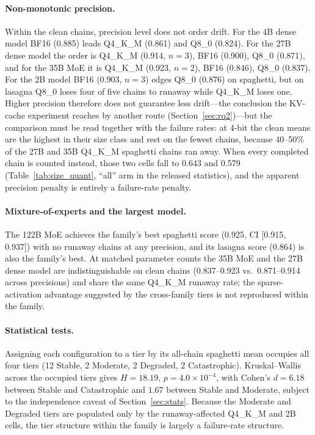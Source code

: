 \documentclass[11pt]{article}
\begin{document}
\paragraph{Non-monotonic precision.}
Within the clean chains, precision level does not order drift. For the 4B
dense model BF16 (0.885) leads Q4\_K\_M (0.861) and Q8\_0 (0.824). For the
27B dense model the order is Q4\_K\_M (0.914, $n=3$), BF16 (0.900), Q8\_0
(0.871), and for the 35B MoE it is Q4\_K\_M (0.923, $n=2$), BF16 (0.846),
Q8\_0 (0.837). For the 2B model BF16 (0.903, $n=3$) edges Q8\_0 (0.876) on
spaghetti, but on lasagna Q8\_0 loses four of five chains to runaway while
Q4\_K\_M loses one. Higher precision therefore does not guarantee less
drift---the conclusion the KV-cache experiment reaches by another route
(Section~\ref{sec:rq2})---but the comparison must be read together with the
failure rates: at 4-bit the clean means are the highest in their size class
and rest on the fewest chains, because 40--50\% of the 27B and 35B Q4\_K\_M
spaghetti chains ran away. When every completed chain is counted instead,
those two cells fall to 0.643 and 0.579 (Table~\ref{tab:size_quant},
``all'' arm in the released statistics), and the apparent precision penalty
is entirely a failure-rate penalty.

\paragraph{Mixture-of-experts and the largest model.}
The 122B MoE achieves the family's best spaghetti score (0.925, CI
[0.915, 0.937]) with no runaway chains at any precision, and its lasagna
score (0.864) is also the family's best. At matched parameter counts the
35B MoE and the 27B dense model are indistinguishable on clean chains
(0.837--0.923 vs.\ 0.871--0.914 across precisions) and share the same
Q4\_K\_M runaway rate; the sparse-activation advantage suggested by the
cross-family tiers is not reproduced within the family.

\paragraph{Statistical tests.}
Assigning each configuration to a tier by its all-chain spaghetti mean
occupies all four tiers (12 Stable, 2 Moderate, 2 Degraded, 2
Catastrophic). Kruskal--Wallis across the occupied tiers gives $H = 18.19$,
$p = 4.0 \times 10^{-4}$, with Cohen's $d = 6.18$ between Stable and
Catastrophic and $1.67$ between Stable and Moderate, subject to the
independence caveat of Section~\ref{sec:stats}. Because the Moderate and
Degraded tiers are populated only by the runaway-affected Q4\_K\_M and 2B
cells, the tier structure within the family is largely a failure-rate
structure.
\end{document}
